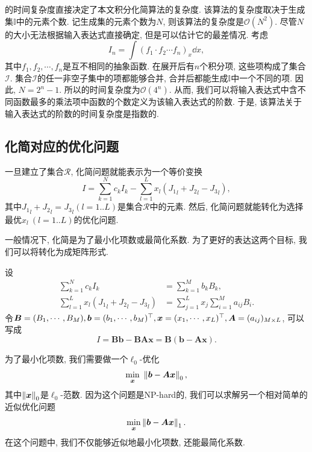 的时间复杂度直接决定了本文积分化简算法的复杂度. 该算法的复杂度取决于生成集$\mathbb I$中的元素个数. 记生成集的元素个数为$N$, 则该算法的复杂度是$\mathcal O(N^2)$. 尽管$N$的大小无法根据输入表达式直接确定, 但是可以估计它的最差情况. 考虑
\begin{equation}
I_n=\int\!{(f_1\cdot f_2\cdots f_n)_x \dd x},
\label{worst_case}
\end{equation}
其中$f_1,f_2,\cdots,f_n$是互不相同的抽象函数. 在展开后有$n$个积分项, 这些项构成了集合$\mathcal I$. 集合$\mathcal I$的任一非空子集中的项都能够合并, 合并后都能生成$\mathbb I$中一个不同的项. 因此, $N=2^n-1$. 所以的时间复杂度为$\mathcal O(4^n)$. 从而, 我们可以将输入表达式中含不同函数最多的乘法项中函数的个数定义为该输入表达式的阶数. 于是, 该算法关于输入表达式的阶数的时间复杂度是指数的. 

\subsection{化简对应的优化问题}\label{optimization-03}
一旦建立了集合$\mathcal R$, 化简问题就能表示为一个等价变换
\begin{equation}
I=\sum_{k=1}^N{c_k I_k}-\sum_{l=1}^L{x_l ({J_1}_l+{J_2}_l-{J_3}_l)},
\label{normal_simplify}
\end{equation}
其中${J_1}_l+{J_2}_l={J_3}_l(l=1..L)$是集合$\mathcal R$中的元素. 然后, 化简问题就能转化为选择最优$x_l~(l=1..L)$的优化问题.

一般情况下, 化简是为了最小化项数或最简化系数. 为了更好的表达这两个目标, 我们可以将转化为成矩阵形式. 

设 
\begin{equation}
\begin{split}
\sum_{k=1}^N{c_k I_k} &= \sum_{k=1}^M{b_k B_k},\\
\sum_{l=1}^L{x_l ({J_1}_l+{J_2}_l-{J_3}_l)} &= \sum_{j=1}^L{x_j \sum_{i=1}^M{a_{ij} B_i}}.
\end{split}
\end{equation} 
令$\bm B=(B_1,\cdots,B_M),\bm b=(b_1,\cdots,b_M)^\top,\bm x=(x_1,\cdots,x_L)^\top,\bm A=(a_{ij})_{M \times L}$, 可以写成 
\begin{equation}
I=\bm{B}\bm{b}-\bm{B}\bm{A}\bm{x}=\bm{B}(\bm{b}-\bm{A}\bm{x}).
\end{equation}

为了最小化项数, 我们需要做一个$\ell_0$-优化
\begin{equation}
    \underset{\bm x}\min~\left\Vert\bm{b}-\bm{A}\bm{x}\right\Vert_0,
\end{equation}
其中$\left\Vert\bm x\right\Vert_0$是$\ell_0$-范数. 因为这个问题是NP-hard的, 我们可以求解另一个相对简单的近似优化问题
\begin{equation}
\underset{\bm x}\min\left\Vert\bm{b}-\bm{A}\bm{x}\right\Vert_1.
\label{LAE}
\end{equation}
在这个问题中, 我们不仅能够近似地最小化项数, 还能最简化系数. 

